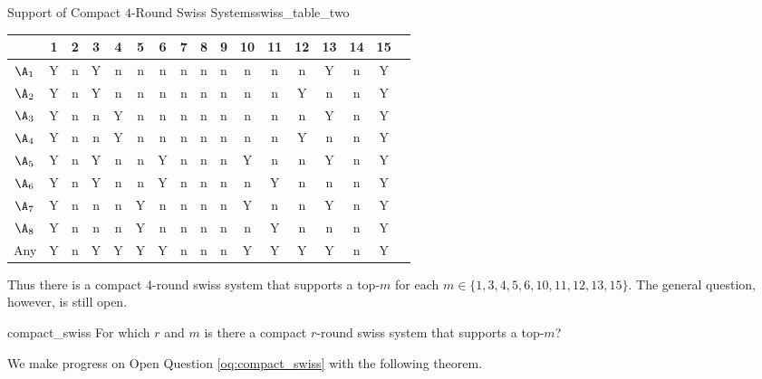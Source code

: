 {    \begin{figg}{Support of Compact $4$-Round Swiss Systems}{swiss_table_two}
        \begin{center}
            \begin{tabular}{ c | c c c c c c c c c c c c c c c c }
            & 1 & 2 & 3 & 4 & 5 & 6 & 7 & 8 & 9 & 10 & 11 & 12 & 13 & 14 & 15\\
            \hline
            $\A_1$ & Y & n & Y & n & n & n & n  & n & n & n & n & n & Y & n & Y\\
            $\A_2$ & Y & n & Y & n & n & n & n  & n & n & n & n & Y & n & n & Y\\
            $\A_3$ & Y & n & n & Y & n & n & n  & n & n & n & n & n & Y & n & Y\\
            $\A_4$ & Y & n & n & Y & n & n & n  & n & n & n & n & Y & n & n & Y\\
            $\A_5$ & Y & n & Y & n & n & Y & n  & n & n & Y & n & n & Y & n & Y\\
            $\A_6$ & Y & n & Y & n & n & Y & n  & n & n & n & Y & n & n & n & Y\\
            $\A_7$ & Y & n & n & n & Y & n & n  & n & n & Y & n & n & Y & n & Y\\
            $\A_8$ & Y & n & n & n & Y & n & n  & n & n & n & Y & n & n & n & Y\\
            Any & Y & n & Y & Y & Y & Y & n  & n & n & Y & Y & Y & Y & n & Y\\
            \end{tabular}
        \end{center}
    \end{figg}

    Thus there is a compact $4$-round swiss system that supports a top-$m$ for each $m \in \{1, 3, 4, 5, 6, 10, 11, 12, 13, 15\}.$ The general question, however, is still open.

    \begin{oq}{}{compact_swiss}
        For which $r$ and $m$ is there a compact $r$-round swiss system that supports a top-$m$?
    \end{oq}

    We make progress on Open Question \ref{oq:compact_swiss} with the following theorem.
    
    }
